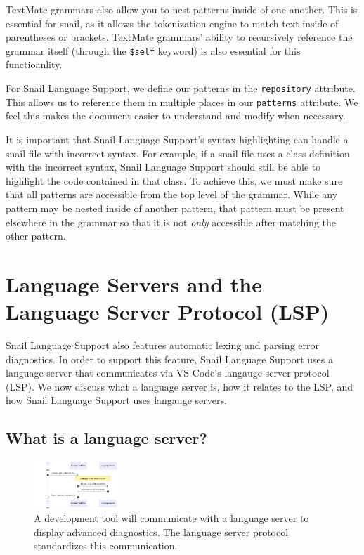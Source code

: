 \documentclass{article}
\begin{document}
TextMate grammars also allow you to nest patterns inside of one another. This is essential for snail, as it allows the tokenization engine to match text inside of parentheses or brackets. TextMate grammars' ability to recursively reference the grammar itself (through the \lstinline{$self} keyword) is also essential for this functioanlity. 

For Snail Language Support, we define our patterns in the \lstinline{repository} attribute. This allows us to reference them in multiple places in our \lstinline{patterns} attribute. We feel this makes the document easier to understand and modify when necessary. 

It is important that Snail Language Support's syntax highlighting can handle a snail file with incorrect syntax. For example, if a snail file uses a class definition with the incorrect syntax, Snail Language Support should still be able to highlight the code contained in that class. To achieve this, we must make sure that all patterns are accessible from the top level of the grammar. While any pattern may be nested inside of another pattern, that pattern must be present elsewhere in the grammar so that it is not \emph{only} accessible after matching the other pattern.

\section{Language Servers and the Language Server Protocol (LSP)}

Snail Language Support also features automatic lexing and parsing error diagnostics. In order to support this feature, Snail Language Support uses a language server that communicates via VS Code's langauge server protocol (LSP). We now discuss what a language server is, how it relates to the LSP, and how Snail Language Support uses langauge servers. 

\subsection{What is a language server?}

\begin{figure}
    \begin{center}
        \includegraphics[width=0.3\textwidth]{lsp-basic.png}
        \caption{A development tool will communicate with a language server to display advanced diagnostics. The language server protocol standardizes this communication.}
    \end{center}
    \label{fig:lsp-basic}
\end{figure}
\end{document}
